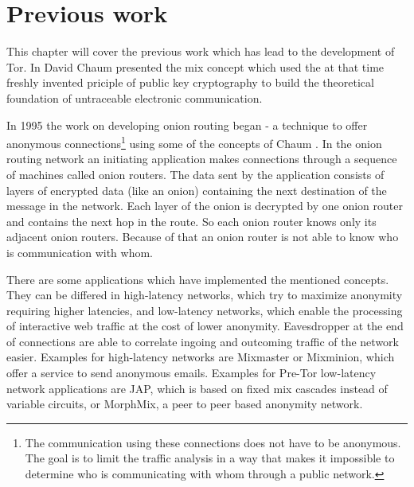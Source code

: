 



\section{Previous work}

This chapter will cover the previous work which has lead to the development of Tor. 
In \cite{chaum1981untraceable} David Chaum presented the mix concept which used the at that time freshly invented priciple of public key cryptography to build the theoretical foundation of untraceable electronic communication.

In 1995 the work on developing onion routing began - a technique to offer anonymous connections\footnote{
	The communication using these connections does not have to be anonymous. The goal is to limit the traffic analysis in a way that makes it impossible to determine who is communicating with whom through a public network.
} using some of the concepts of Chaum \cite{onionroutingproject, goldschlag1996hiding, reed1998anonymous}. In the onion routing network an initiating application makes connections through a sequence of machines called onion routers. The data sent by the application consists of layers of encrypted data (like an onion) containing the next destination of the message in the network. Each layer of the onion is decrypted by one onion router and contains the next hop in the route. So each onion router knows only its adjacent onion routers. Because of that an onion router is not able to know who is communication with whom. 


There are some applications which have implemented the mentioned concepts. They can be differed in high-latency networks, which try to maximize anonymity requiring higher latencies, and low-latency networks, which enable the processing of interactive web traffic at the cost of lower anonymity. Eavesdropper at the end of connections are able to correlate ingoing and outcoming traffic of the network easier. Examples for high-latency networks are Mixmaster or Mixminion, which offer a service to send anonymous emails. Examples for Pre-Tor low-latency network applications are JAP, which is based on fixed mix cascades instead of variable circuits, or MorphMix, a peer to peer based anonymity network.


